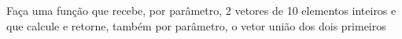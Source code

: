 
\question[10]

Faça uma função que recebe, por parâmetro, 2 vetores de 10 elementos inteiros e que calcule e retorne, também por parâmetro, o vetor união dos dois primeiros